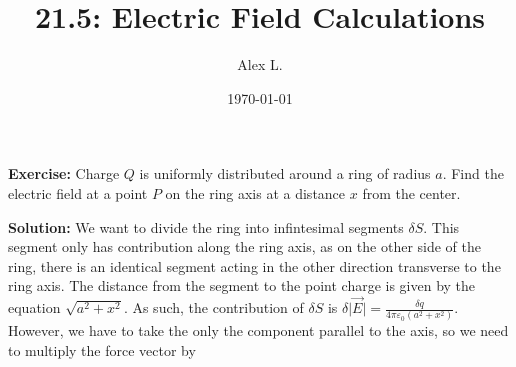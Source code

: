 \documentclass{article}
\title{21.5: Electric Field Calculations}
\author{Alex L.}
\date{\today}
\begin{document}
\maketitle

\textbf{Exercise:} Charge $Q$ is uniformly distributed around a ring of radius $a$. Find the electric field at a point $P$ on the ring axis at a distance $x$ from the center.

\textbf{Solution:} We want to divide the ring into infintesimal segments $\delta S$. This segment only has contribution along the ring axis, as on the other side of the ring, there is an identical segment acting in the other direction transverse to the ring axis. The distance from the segment to the point charge is given by the equation $\sqrt{a^2 + x^2}$. As such, the contribution of $\delta S$ is  $\delta \vert \vec{E} \vert = \frac{\delta q}{4 \pi \varepsilon_0 (a^2 + x^2)}$. However, we have to take the only the component parallel to the axis, so we need to multiply the force vector by 
\end{document}
